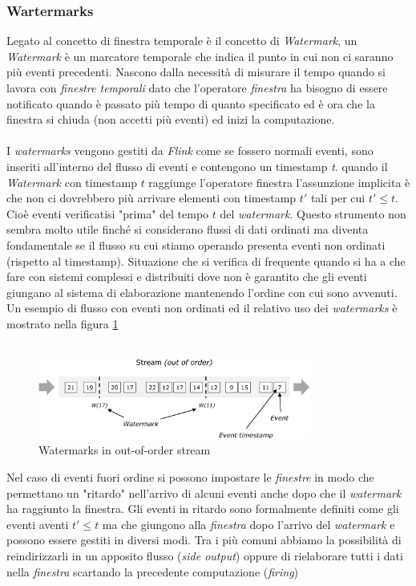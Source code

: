 \subsubsection{Wartermarks}
\label{subsubsec:flink_watermarks}
Legato al concetto di finestra temporale è il concetto di \textit{Watermark}, un \textit{Watermark} è un marcatore temporale che indica il punto in cui non ci saranno più eventi precedenti.
Nascono dalla necessità di misurare il tempo quando si lavora con \textit{finestre temporali} dato che l'operatore \textit{finestra} ha bisogno di essere notificato
quando è passato più tempo di quanto specificato ed è ora che la finestra si chiuda (non accetti più eventi) ed inizi la computazione.\\\\
I \textit{watermarks} vengono gestiti da \textit{Flink} come se fossero normali eventi, sono inseriti all'interno del flusso di eventi e contengono un timestamp \textit{t}.
quando il \textit{Watermark} con timestamp $t$ raggiunge l'operatore finestra l'assunzione implicita è che non ci dovrebbero più arrivare elementi con timestamp $t'$ tali per cui $t' \leq t$.
Cioè eventi verificatisi "prima" del tempo $t$ del \textit{watermark}.
Questo strumento non sembra molto utile finché si considerano flussi di dati ordinati ma diventa fondamentale se il flusso su cui stiamo operando presenta eventi
non ordinati (rispetto al timestamp).
Situazione che si verifica di frequente quando si ha a che fare con sistemi complessi e distribuiti dove non è garantito che gli eventi 
giungano al sistema di elaborazione mantenendo l'ordine con cui sono avvenuti.
Un esempio di flusso con eventi non ordinati ed il relativo uso dei \textit{watermarks} è mostrato nella figura \ref{fig:watermark}\\\\
\begin{figure}[htbp]
    \centering
    \includegraphics[width=0.8\textwidth]{images/flink/watermark_out_of_order.png}
    \caption{Watermarks in out-of-order stream}
    \label{fig:watermark}
\end{figure}
Nel caso di eventi fuori ordine si possono impostare le \textit{finestre} in modo che permettano un "ritardo" nell'arrivo di alcuni eventi anche dopo che il \textit{watermark} ha raggiunto la finestra.
Gli eventi in ritardo sono formalmente definiti come gli eventi aventi $t' \leq t$ ma che giungono alla \textit{finestra} dopo l'arrivo del \textit{watermark} e possono essere gestiti in diversi modi.
Tra i più comuni abbiamo la possibilità di reindirizzarli in un apposito flusso (\textit{side output}) oppure di rielaborare tutti i dati nella \textit{finestra} scartando la precedente computazione (\textit{firing})


